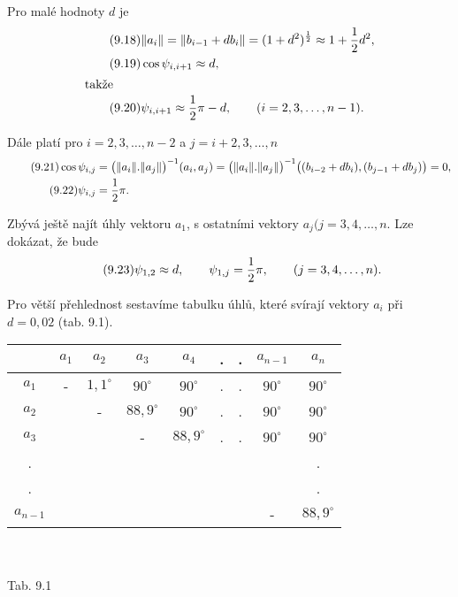 \noindent
Pro malé hodnoty $d$ je
%
\begin{align*}
\tag{9.18}
&\Vert a_i \Vert = \Vert b_{i-1} +db_i \Vert = (1+d^2)^{1\over2}
      \approx 1 + {1\over2} {d^2},\\
\tag{9.19}
&\cos \psi_{i,i+1} \approx d{,}\\
%
\shortintertext{takže}
%
\tag{9.20}
&\psi_{i,i+1} \approx {1\over2} \pi - d, \qquad (i=2,3,\ldots,n-1).
\end{align*}

\noindent
Dále platí pro $i=2,3,\ldots,n-2$ a $j=i+2,3,\ldots,n$
%
\begin{align*}
\tag{9.21}
\cos \psi_{i,j} &= \big(\Vert a_i \Vert.\Vert a_j\Vert\big)^{-1}(a_i,a_j)=
     \big(\Vert a_i\Vert.\Vert a_j\Vert\big)^{-1}
     \big((b_{i-2}+db_i),(b_{j-1}+db_j)\big) = 0,\\
\tag{9.22}
\psi_{i,j} &= {1\over2}\pi.
\end{align*}

\noindent
Zbývá ještě najít úhly vektoru $a_1$, s ostatními vektory $a_j
(j=3,4,\ldots,n$. Lze dokázat, že bude
%
\begin{align*}
\tag{9.23}
\psi_{1,2} \approx d, \qquad
\psi_{1,j} = {1\over2}\pi, \qquad
(j=3,4,\ldots,n).
\end{align*}

\noindent
Pro větší přehlednost sestavíme tabulku úhlů, které svírají
vektory $a_i$ při $d=0,02$ (tab. 9.1).

\begin{table}
\begin{center}
\begin{tabular}{|c|c|c|c|c|c c|c|c|}
\hline
~ & $a_1$ & $a_2$ & $a_3$ & $a_4$ &.&.& $a_{n-1}$ & $a_n$ \\
\hline
$a_1$&-&$1,1^\circ$ & $90^\circ$ & $90^\circ$ &.&.& $90^\circ$ & $90^\circ$ \\
$a_2$&&-& $88,9^\circ$ & $90^\circ$ &.&.& $90^\circ$ & $90^\circ$ \\
$a_3$&&&-& $88,9^\circ$ &.&.& $90^\circ$ & $90^\circ$ \\
.&&&&&&&&.\\
.&&&&&&&&.\\
$a_{n-1}$&&&&&&&-&$88,9^\circ$\\
\hline
\end{tabular}\\
~\\
Tab. 9.1\\
\end{center}
\end{table}

